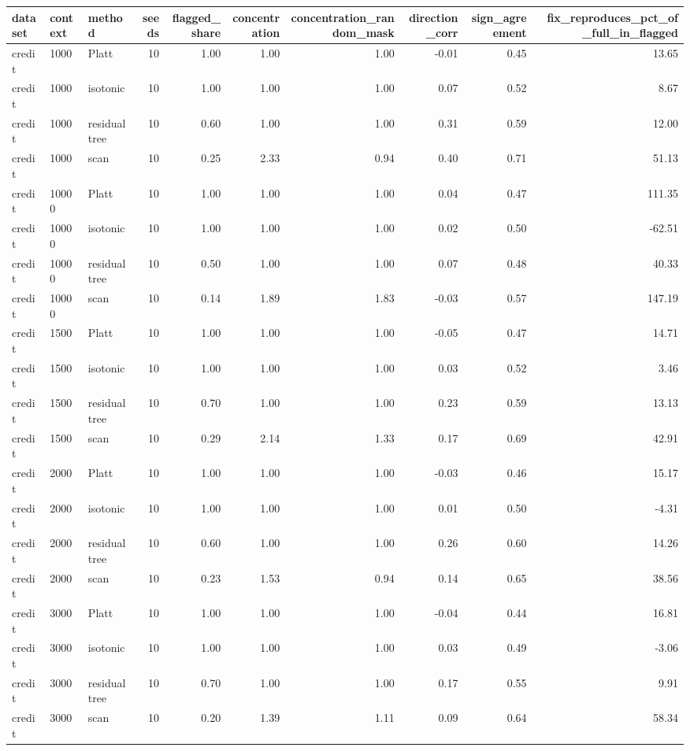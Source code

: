 \begin{tabular}{lllrrrrrrr}
\toprule
dataset & context & method & seeds & flagged_share & concentration & concentration_random_mask & direction_corr & sign_agreement & fix_reproduces_pct_of_full_in_flagged \\
\midrule
credit & 1000 & Platt & 10 & 1.00 & 1.00 & 1.00 & -0.01 & 0.45 & 13.65 \\
credit & 1000 & isotonic & 10 & 1.00 & 1.00 & 1.00 & 0.07 & 0.52 & 8.67 \\
credit & 1000 & residual tree & 10 & 0.60 & 1.00 & 1.00 & 0.31 & 0.59 & 12.00 \\
credit & 1000 & scan & 10 & 0.25 & 2.33 & 0.94 & 0.40 & 0.71 & 51.13 \\
credit & 10000 & Platt & 10 & 1.00 & 1.00 & 1.00 & 0.04 & 0.47 & 111.35 \\
credit & 10000 & isotonic & 10 & 1.00 & 1.00 & 1.00 & 0.02 & 0.50 & -62.51 \\
credit & 10000 & residual tree & 10 & 0.50 & 1.00 & 1.00 & 0.07 & 0.48 & 40.33 \\
credit & 10000 & scan & 10 & 0.14 & 1.89 & 1.83 & -0.03 & 0.57 & 147.19 \\
credit & 1500 & Platt & 10 & 1.00 & 1.00 & 1.00 & -0.05 & 0.47 & 14.71 \\
credit & 1500 & isotonic & 10 & 1.00 & 1.00 & 1.00 & 0.03 & 0.52 & 3.46 \\
credit & 1500 & residual tree & 10 & 0.70 & 1.00 & 1.00 & 0.23 & 0.59 & 13.13 \\
credit & 1500 & scan & 10 & 0.29 & 2.14 & 1.33 & 0.17 & 0.69 & 42.91 \\
credit & 2000 & Platt & 10 & 1.00 & 1.00 & 1.00 & -0.03 & 0.46 & 15.17 \\
credit & 2000 & isotonic & 10 & 1.00 & 1.00 & 1.00 & 0.01 & 0.50 & -4.31 \\
credit & 2000 & residual tree & 10 & 0.60 & 1.00 & 1.00 & 0.26 & 0.60 & 14.26 \\
credit & 2000 & scan & 10 & 0.23 & 1.53 & 0.94 & 0.14 & 0.65 & 38.56 \\
credit & 3000 & Platt & 10 & 1.00 & 1.00 & 1.00 & -0.04 & 0.44 & 16.81 \\
credit & 3000 & isotonic & 10 & 1.00 & 1.00 & 1.00 & 0.03 & 0.49 & -3.06 \\
credit & 3000 & residual tree & 10 & 0.70 & 1.00 & 1.00 & 0.17 & 0.55 & 9.91 \\
credit & 3000 & scan & 10 & 0.20 & 1.39 & 1.11 & 0.09 & 0.64 & 58.34 \\

\end{tabular}
